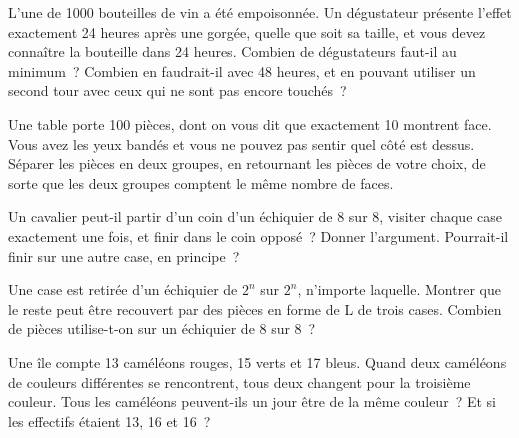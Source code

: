 \begin{question}\label{iq:iv1:logic-riddles:15}
L'une de 1000 bouteilles de vin a été empoisonnée. Un dégustateur présente l'effet exactement 24 heures après une gorgée, quelle que soit sa taille, et vous devez connaître la bouteille dans 24 heures. Combien de dégustateurs faut-il au minimum~? Combien en faudrait-il avec 48 heures, et en pouvant utiliser un second tour avec ceux qui ne sont pas encore touchés~?
\end{question}

\begin{question}\label{iq:iv1:logic-riddles:16}
Une table porte 100 pièces, dont on vous dit que exactement 10 montrent face. Vous avez les yeux bandés et vous ne pouvez pas sentir quel côté est dessus. Séparer les pièces en deux groupes, en retournant les pièces de votre choix, de sorte que les deux groupes comptent le même nombre de faces.
\end{question}

\begin{question}\label{iq:iv1:logic-riddles:17}
Un cavalier peut-il partir d'un coin d'un échiquier de 8 sur 8, visiter chaque case exactement une fois, et finir dans le coin opposé~? Donner l'argument. Pourrait-il finir sur une autre case, en principe~?
\end{question}

\begin{question}\label{iq:iv1:logic-riddles:18}
Une case est retirée d'un échiquier de $2^n$ sur $2^n$, n'importe laquelle. Montrer que le reste peut être recouvert par des pièces en forme de L de trois cases. Combien de pièces utilise-t-on sur un échiquier de 8 sur 8~?
\end{question}

\begin{question}\label{iq:iv1:logic-riddles:19}
Une île compte 13 caméléons rouges, 15 verts et 17 bleus. Quand deux caméléons de couleurs différentes se rencontrent, tous deux changent pour la troisième couleur. Tous les caméléons peuvent-ils un jour être de la même couleur~? Et si les effectifs étaient 13, 16 et 16~?
\end{question}

